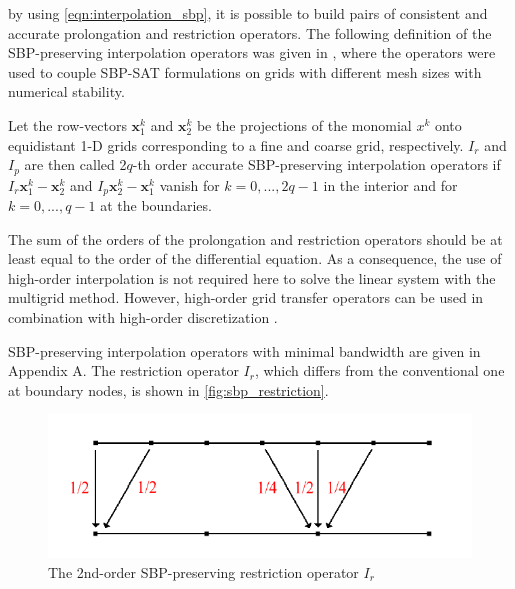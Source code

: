by using \autoref{eqn:interpolation_sbp}, it is possible to build pairs of consistent and accurate prolongation and restriction operators. The following definition of the SBP-preserving interpolation operators was given in \citep{RUGGIU2018216}, where the operators were used to couple SBP-SAT formulations on grids with different mesh sizes with numerical stability.



\begin{definition}
  Let the row-vectors $\mathbf{x}_1^k$ and $\mathbf{x}_2^k$ be the projections of the monomial $x^k$ onto equidistant 1-D grids corresponding to a fine and coarse grid, respectively. $I_r$ and $I_p$ are then called 2$q$-th order accurate SBP-preserving interpolation operators if $I_r\mathbf{x}_1^k - \mathbf{x}_2^k$ and $I_p\mathbf{x}_2^k - \mathbf{x}_1^k$ vanish for $k = 0, ...,2q-1$ in the interior and for $k=0,...,q-1$ at the boundaries.
\end{definition}


The sum of the orders of the prolongation and restriction operators should be at least equal to the order of the differential equation. As a consequence, the use of high-order interpolation is not required here to solve the linear system with the multigrid method. However, high-order grid transfer operators can be used in combination with high-order discretization \citep{sundar2015comparison}. 

SBP-preserving interpolation operators with minimal bandwidth are given in Appendix A. The restriction operator $I_r$, which differs from the conventional one at boundary nodes, is shown in \autoref{fig:sbp_restriction}.


\begin{figure}
    \centering
    \includegraphics{figures/sbp_restriction.png}
    \centering
    \caption{The 2nd-order SBP-preserving restriction operator $I_r$}
    \label{fig:sbp_restriction}
\end{figure}





